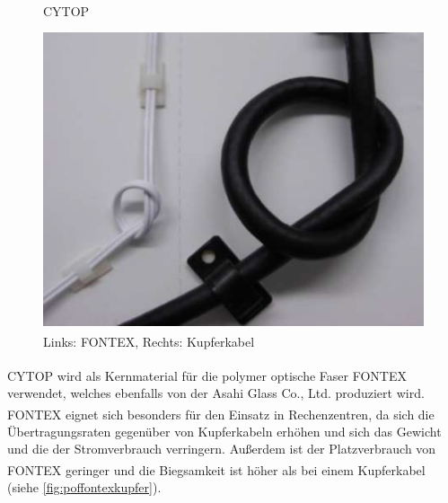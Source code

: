 \begin{figure}[H]
    \begin{center}
        \begin{minipage}{0.4\textwidth}
            \begin{center}
                \footnotesize


                \caption{CYTOP\textsuperscript{\texttrademark}}
                \label{rec:cytop}
            \end{center}
        \end{minipage}
        \hspace{0.025\textwidth}
        \begin{minipage}{0.4\textwidth}
            \begin{center}
                \includegraphics[height=0.1275\textheight]{Bilder/Optische_Wellenleiter_Die_Polymer_Optische_Faser/Cytop/poffontexkupfer.png}
                \caption[Links: FONTEX\textsuperscript{\texttrademark}, Rechts: Kupferkabel\newline              \url{www.lucina.jp/eg_fontex/pdf/Tecnhical.pdf S.10 (zuletzt aufgerufen am 19.09.2015)}]{Links: FONTEX\textsuperscript{\texttrademark}, Rechts: Kupferkabel}
                \label{fig:poffontexkupfer}
            \end{center}
        \end{minipage}
    \end{center}
\end{figure}

CYTOP\textsuperscript{\texttrademark} wird als Kernmaterial für die polymer
optische Faser FONTEX\textsuperscript{\texttrademark} verwendet, welches
ebenfalls von der Asahi Glass Co., Ltd. produziert wird.
FONTEX\textsuperscript{\texttrademark} eignet sich besonders für den Einsatz in
Rechenzentren, da sich die Übertragungsraten gegenüber von Kupferkabeln erhöhen
und sich das Gewicht und die der Stromverbrauch verringern. Außerdem ist der
Platzverbrauch von FONTEX\textsuperscript{\texttrademark} geringer und die
Biegsamkeit ist höher als bei einem Kupferkabel (siehe
\autoref{fig:poffontexkupfer}). \cite{poffontex}

